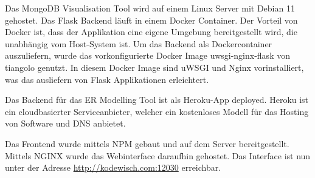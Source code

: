 \iffalse
Aufgabe des Kapitels Inbetriebnahme ist es, die Überführung der in 
Kapitel \ref{cha:implementierung} entwickelte Lösung in das betriebliche 
Umfeld aufzuzeigen. Dabei wird beispielsweise die Inbetriebnahme eines 
Programms beschrieben oder die Integration eines erstellten 
Programmodules dargestellt.

Bei der Software-Erstellung entspricht dieses Kapitel der 
Auslieferungsphase (Deployment) im \ac{rup}.
\fi

Das MongoDB Visualisation Tool wird auf einem Linux Server mit Debian 11 gehostet.
Das Flask Backend läuft in einem Docker Container.
Der Vorteil von Docker ist, dass der Applikation eine eigene Umgebung bereitgestellt wird, die unabhängig vom Host-System ist.
Um das Backend als Dockercontainer auszuliefern, wurde das vorkonfigurierte Docker Image uwsgi-nginx-flask von tiangolo genutzt.
In diesem Docker Image sind uWSGI und Nginx vorinstalliert, was das ausliefern von Flask Applikationen erleichtert.
~\autocite{tiangolo:uwsgi-nginx-flask}

Das Backend für das ER Modelling Tool ist als Heroku-App deployed.
Heroku ist ein cloudbasierter Serviceanbieter, welcher ein kostenloses Modell für das Hosting von Software und DNS anbietet.
~\autocite{heroku:heroku}

Das Frontend wurde mittels NPM gebaut und auf dem Server bereitgestellt.
Mittels NGINX wurde das Webinterface daraufhin gehostet. 
Das Interface ist nun unter der Adresse \url{http://kodewisch.com:12030} erreichbar.
